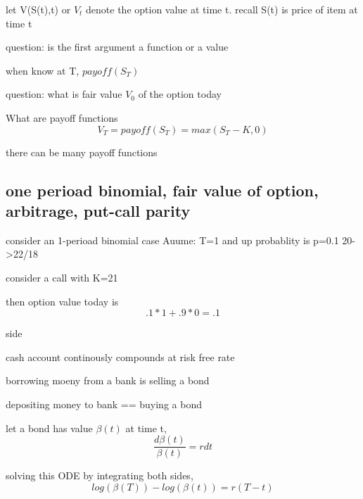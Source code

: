 \documentclass[10pt]{article}
\theoremstyle{break}
\begin{document}
let V(S(t),t) or $V_t$ denote the option value at time t.
recall S(t) is price of item at time t


question: is the first argument a function or a value

when know at T, $payoff(S_T)$

question: what is fair value $V_0$ of the option today 

What are payoff functions $$V_T=payoff(S_T)=max(S_T-K, 0)$$

there can be many payoff functions 


\subsection{one perioad binomial, fair value of option, arbitrage, put-call parity}

consider an 1-perioad binomial case 
Auume: T=1 and up probablity is p=0.1
20->22/18

consider a call with K=21

then option value today is 
$$.1*1+.9*0=.1$$

side 

cash account continously compounds at risk free rate 

borrowing moeny from a bank is selling a bond 

depositing money to bank == buying a bond 

let a bond has value $\beta(t)$ at time t,
$$\frac{d\beta(t)}{\beta(t)}=rdt$$

solving this ODE by integrating both sides,
$$log(\beta(T))-log(\beta(t))=r(T-t)$$

Discounting: 1 year ago, 
$$\beta(T)=1 \rightarrow \beta(t)=e^{-r(T-t)}$$

Discounting: 1 year ago, 
$$\beta(t)=1 \rightarrow \beta(T)=e^{r(T-t)}$$

An aaritage is trading opportunity to make a no-risk
profit greater than that of a bank deposit 
which earns interest $r \geq 0$ 

Example: buy one share of stock and borrow 100 (sell bonds)
$$H_0=1*S_0-100\text{ or } H_0=\{S_0, -100\}$$
the value at time t:
$$H_t=S_t-100e^{rt}$$

Mathematical characterization of an Arbitrage Strategy 

A profolio with initail $H_0=0$ but $H^T>0$ is arbitrage

question: interest rate?

\subsubsection{Put and Call Parity} 
\end{document}
